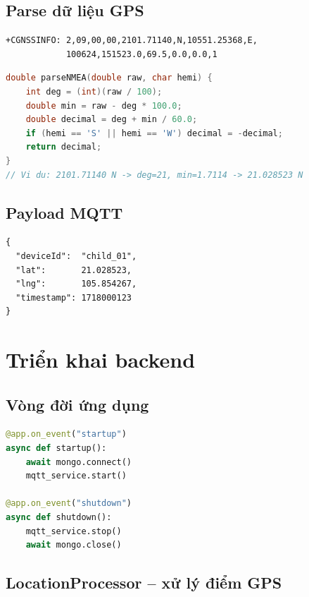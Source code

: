 \documentclass[13pt, a4paper]{report}
\begin{document}
\subsection{Parse dữ liệu GPS}

\begin{lstlisting}[caption=Phản hồi AT+CGNSSINFO]
+CGNSSINFO: 2,09,00,00,2101.71140,N,10551.25368,E,
            100624,151523.0,69.5,0.0,0.0,1
\end{lstlisting}

\begin{lstlisting}[language=C++, caption=Hàm parse NMEA sang decimal degrees]
double parseNMEA(double raw, char hemi) {
    int deg = (int)(raw / 100);
    double min = raw - deg * 100.0;
    double decimal = deg + min / 60.0;
    if (hemi == 'S' || hemi == 'W') decimal = -decimal;
    return decimal;
}
// Vi du: 2101.71140 N -> deg=21, min=1.7114 -> 21.028523 N
\end{lstlisting}

\subsection{Payload MQTT}

\begin{lstlisting}[caption=JSON payload gửi lên MQTT]
{
  "deviceId":  "child_01",
  "lat":       21.028523,
  "lng":       105.854267,
  "timestamp": 1718000123
}
\end{lstlisting}

\section{Triển khai backend}

\subsection{Vòng đời ứng dụng}

\begin{lstlisting}[language=python, caption=backend/app/main.py]
@app.on_event("startup")
async def startup():
    await mongo.connect()
    mqtt_service.start()

@app.on_event("shutdown")
async def shutdown():
    mqtt_service.stop()
    await mongo.close()
\end{lstlisting}

\subsection{LocationProcessor -- xử lý điểm GPS}
\end{document}
